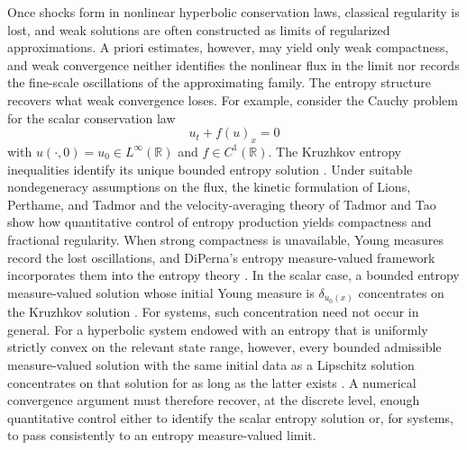\documentclass[11pt]{amsart}
\theoremstyle{plain}
\theoremstyle{definition}
\theoremstyle{remark}
\numberwithin{equation}{section}
\theoremstyle{plain}
\begin{document}
Once shocks form in nonlinear hyperbolic conservation laws, classical
regularity is lost, and weak solutions are often constructed as limits
of regularized approximations.  A priori
estimates, however, may yield only weak compactness, and weak
convergence neither identifies the nonlinear flux in the limit nor
records the fine-scale oscillations of the approximating family. 
The entropy structure recovers what weak convergence loses.  For example,
consider the Cauchy problem for the scalar conservation law
\begin{equation}\label{eq:intro-conservation-law}
	u_t+f(u)_x=0
\end{equation}
with $u(\cdot,0)=u_0\in L^\infty(\mathbb R)$ and
$f\in C^1(\mathbb R)$.  The Kruzhkov entropy inequalities identify
its unique bounded entropy solution \cite{Kruzkov}. 
Under suitable nondegeneracy assumptions on the flux, the kinetic
formulation of Lions, Perthame, and Tadmor \cite{LPT} and the velocity-averaging
theory of Tadmor and Tao \cite{TadmorTao} show how quantitative control of entropy
production yields compactness and fractional regularity. 
 When strong compactness is
unavailable, Young measures record the lost oscillations, and
DiPerna's entropy measure-valued framework incorporates them into the
entropy theory \cite{DiPernaMV}.  
In the scalar case, a bounded entropy measure-valued solution whose
initial Young measure is $\delta_{u_0(x)}$ concentrates on the
Kruzhkov solution \cite{DiPernaMV}. 
 For systems, such concentration need not
occur in general.  For a hyperbolic system endowed with an entropy
that is uniformly strictly convex on the relevant state range,
however, every bounded admissible measure-valued solution with the
same initial data as a Lipschitz solution concentrates on that
solution for as long as the latter exists \cite{BLS}.  
A numerical
convergence argument must therefore recover, at the discrete level, 
enough quantitative control either to identify the scalar entropy
solution or, for systems, to pass consistently to an entropy
measure-valued limit.
\end{document}

